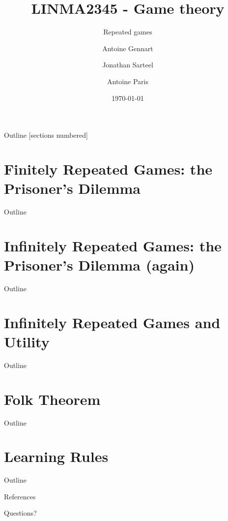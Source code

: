 \documentclass[10pt, notes, handout]{beamer}
\title{LINMA2345 - Game theory}
\subtitle{Repeated games}
\date{\today}
\author{Antoine Gennart\and Jonathan Sarteel\and Antoine Paris}
\institute{Ecole polytechnique de Louvain}
\begin{document}
\maketitle


\begin{frame}{Outline}
    [sections numbered]
    \tableofcontents[hideallsubsections]
\end{frame}

\section{Finitely Repeated Games: the Prisoner's Dilemma}
\begin{frame}{Outline}
    \tableofcontents[currentsection]
\end{frame}



\section{Infinitely Repeated Games: the Prisoner's Dilemma (again)}
\begin{frame}{Outline}
    \tableofcontents[currentsection]
\end{frame}



\section{Infinitely Repeated Games and Utility}
\begin{frame}{Outline}
    \tableofcontents[currentsection]
\end{frame}



\section{Folk Theorem}
\begin{frame}{Outline}
    \tableofcontents[currentsection]
\end{frame}



\section{Learning Rules}
\begin{frame}{Outline}
    \tableofcontents[currentsection]
\end{frame}




\begin{frame}{References}
    \nocite{*}
    
    
\end{frame}






\begin{frame}[standout]
    Questions?
\end{frame}
\end{document}
